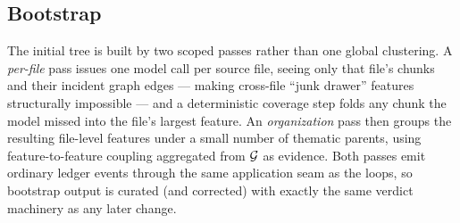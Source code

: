 \subsection{Bootstrap}
\label{sec:bootstrap}

The initial tree is built by two scoped passes rather than one global
clustering. A \emph{per-file} pass issues one model call per source file,
seeing only that file's chunks and their incident graph edges --- making
cross-file ``junk drawer'' features structurally impossible --- and a
deterministic coverage step folds any chunk the model missed into the file's
largest feature. An \emph{organization} pass then groups the resulting
file-level features under a small number of thematic parents, using
feature-to-feature coupling aggregated from $\mathcal{G}$ as evidence. Both passes emit
ordinary ledger events through the same application seam as the loops, so
bootstrap output is curated (and corrected) with exactly the same verdict
machinery as any later change.
